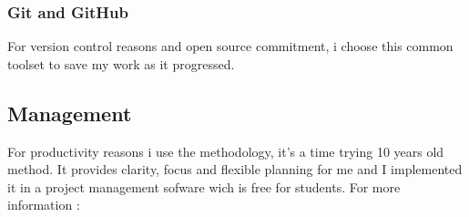 			\subsubsection{Git and GitHub}
For version control reasons and open source commitment, i choose this common toolset to save my work as it progressed.
\cite{Github}
		\subsection{Management}
For productivity reasons i use the \cite{GTD} methodology, it's a time trying 10 years old method. It provides clarity, focus and flexible planning for me and I implemented it in a \cite{WRIKE} project management sofware wich is free for students. For more information : \cite{WRIKE_for_students}
